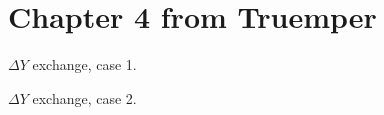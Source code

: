 \section{Chapter 4 from Truemper}

\begin{proposition}[4.4.5]
  \label{prop:4.4.5}
  $\Delta Y$ exchange, case 1.
\end{proposition}

\begin{proposition}[4.4.6]
  \label{prop:4.4.6}
  $\Delta Y$ exchange, case 2.
\end{proposition}
